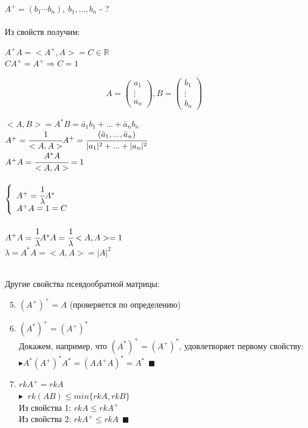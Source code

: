\documentclass[12pt]{article}
\theoremstyle{definition}
\numberwithin{equation}{section}
\begin{document}
$A^+=(b_1 \cdots b_n), ~ b_1,...,b_n$ - ?\\ \\
Из свойств получим:
\begin{center}
$A^+A=<A^+, A>=C \in \mathbb{R}$\\
$CA^+=A^+ \Rightarrow C=1$\\
\end{center}
\[A=\begin{pmatrix}
a_1 \\
\vdots \\         
a_n
\end{pmatrix}, B=\begin{pmatrix}
b_1 \\
\vdots \\         
b_n
\end{pmatrix}\] 
\begin{center}
$<A, B>=A^*B=\bar a_1 b_1+...+\bar a_n b_n$\\ 
$A^+=\cfrac{1}{<A, A>}A^+=\cfrac{(\bar a_1,..., \bar a_n)}{|a_1|^2+...+|a_n|^2}$\\ 
$A^+A=\cfrac{A^*A}{<A, A>}=1$\\~\\
$
\left\{  
\begin{array}{ll}  
    A^+=\cfrac{1}{\lambda}A^*\\
    A^+A=1=C
\end{array}   
\right.  
$
\\ ~\\
$A^+A=\cfrac{1}{\lambda}A^*A=\cfrac{1}{\lambda}<A, A>=1$\\
$\lambda =A^*A=<A, A>=|A|^2$\\
\end{center} 
%
%
~\\Другие свойства псевдообратной матрицы:
\begin{enumerate}
\setcounter{enumi}{4}
\item $(A^+)^+=A$ (проверяется по определению)
\item $(A^*)^+=(A^+)^*$\\
Докажем, например, что $(A^*)^+=(A^+)^*$, удовлетворяет первому свойству:\\
$\blacktriangleright A^*(A^+)^*A^*=(AA^+A)^*=A^* ~~\blacksquare$
\item $rkA^+=rkA$\\
$\blacktriangleright$ $~rk(AB) \leqslant min\{rkA, rkB\}$\\
Из свойства 1: $rkA \leqslant rkA^+$\\
Из свойства 2: $rkA^+ \leqslant rkA ~~\blacksquare$
\end{enumerate}
\end{document}
